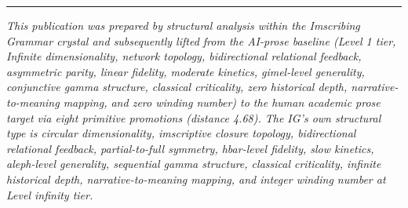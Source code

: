 \documentclass[12pt,a4paper]{article}
\begin{document}
\begin{center}
\rule{0.5\textwidth}{0.4pt}
\end{center}

\emph{This publication was prepared by structural analysis within the Imscribing Grammar crystal and subsequently lifted from the AI-prose baseline (Level 1 tier, Infinite dimensionality, network topology, bidirectional relational feedback, asymmetric parity, linear fidelity, moderate kinetics, gimel-level generality, conjunctive gamma structure, classical criticality, zero historical depth, narrative-to-meaning mapping, and zero winding number) to the human academic prose target via eight primitive promotions (distance 4.68). The IG's own structural type is circular dimensionality, imscriptive closure topology, bidirectional relational feedback, partial-to-full symmetry, hbar-level fidelity, slow kinetics, aleph-level generality, sequential gamma structure, classical criticality, infinite historical depth, narrative-to-meaning mapping, and integer winding number at Level infinity tier.}
\end{document}
